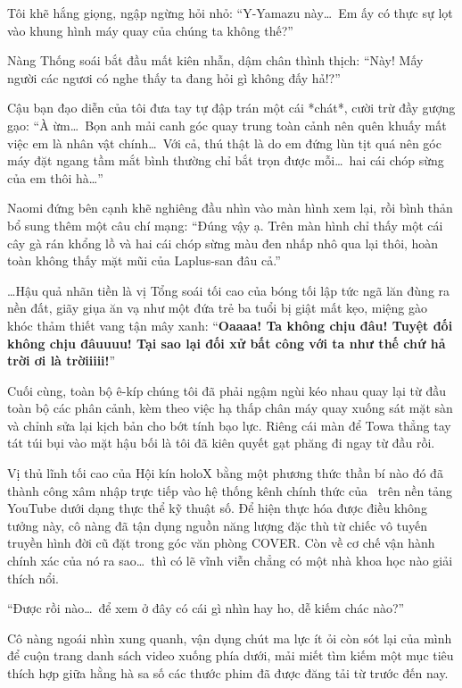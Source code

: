 \documentclass[../main.tex]{subfiles}
\begin{document}
Tôi khẽ hắng giọng, ngập ngừng hỏi nhỏ: ``Y-Yamazu này\dots\ Em ấy có thực sự lọt vào khung hình máy quay của chúng ta không thế?''

Nàng Thống soái bắt đầu mất kiên nhẫn, dậm chân thình thịch: ``Này! Mấy người các ngươi có nghe thấy ta đang hỏi gì không đấy hả!?''

Cậu bạn đạo diễn của tôi đưa tay tự đập trán một cái *chát*, cười trừ đầy gượng gạo: ``À ừm\dots\ Bọn anh mải canh góc quay trung toàn cảnh nên quên khuấy mất việc em là nhân vật chính\dots\ Với cả, thú thật là do em đứng lùn tịt quá nên góc máy đặt ngang tầm mắt bình thường chỉ bắt trọn được mỗi\dots\ hai cái chóp sừng của em thôi hà\dots''

Naomi đứng bên cạnh khẽ nghiêng đầu nhìn vào màn hình xem lại, rồi bình thản bổ sung thêm một câu chí mạng: ``Đúng vậy ạ. Trên màn hình chỉ thấy một cái cây gà rán khổng lồ và hai cái chóp sừng màu đen nhấp nhô qua lại thôi, hoàn toàn không thấy mặt mũi của Laplus-san đâu cả.''

\dots Hậu quả nhãn tiền là vị Tổng soái tối cao của bóng tối lập tức ngã lăn đùng ra nền đất, giãy giụa ăn vạ như một đứa trẻ ba tuổi bị giật mất kẹo, miệng gào khóc thảm thiết vang tận mây xanh: ``\textbf{Oaaaa! Ta không chịu đâu! Tuyệt đối không chịu đâuuuu! Tại sao lại đối xử bất công với ta như thế chứ hả trời ơi là trờiiiii!}''

Cuối cùng, toàn bộ ê-kíp chúng tôi đã phải ngậm ngùi kéo nhau quay lại từ đầu toàn bộ các phân cảnh, kèm theo việc hạ thấp chân máy quay xuống sát mặt sàn và chỉnh sửa lại kịch bản cho bớt tính bạo lực. Riêng cái màn để Towa thẳng tay tát túi bụi vào mặt hậu bối là tôi đã kiên quyết gạt phăng đi ngay từ đầu rồi.

\ct

Vị thủ lĩnh tối cao của Hội kín holoX bằng một phương thức thần bí nào đó đã thành công xâm nhập trực tiếp vào hệ thống kênh chính thức của \hll\ trên nền tảng YouTube dưới dạng thực thể kỹ thuật số. Để hiện thực hóa được điều không tưởng này, cô nàng đã tận dụng nguồn năng lượng đặc thù từ chiếc vô tuyến truyền hình đời cũ đặt trong góc văn phòng COVER. Còn về cơ chế vận hành chính xác của nó ra sao\dots\ thì có lẽ vĩnh viễn chẳng có một nhà khoa học nào giải thích nổi.

``Được rồi nào\dots\ để xem ở đây có cái gì nhìn hay ho, dễ kiếm chác nào?''

Cô nàng ngoái nhìn xung quanh, vận dụng chút ma lực ít ỏi còn sót lại của mình để cuộn trang danh sách video xuống phía dưới, mải miết tìm kiếm một mục tiêu thích hợp giữa hằng hà sa số các thước phim đã được đăng tải từ trước đến nay.
\end{document}
